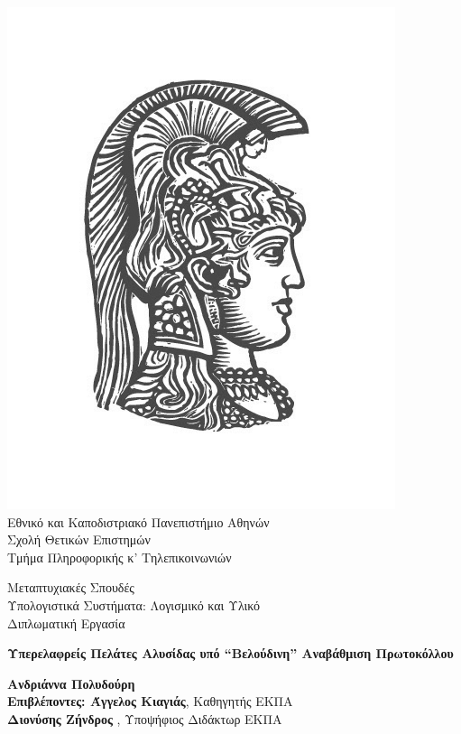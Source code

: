 \begin{center}
    
    \includegraphics[scale=0.8]{figures/logo_uoa.jpg}\\
    {\large Εθνικό και Καποδιστριακό Πανεπιστήμιο Αθηνών \\ 
    Σχολή Θετικών Επιστημών \\ 
    Τμήμα Πληροφορικής κ' Τηλεπικοινωνιών\\}
    \vspace{1cm}
    \begin{LARGE}
        Μεταπτυχιακές Σπουδές \\ 
        Υπολογιστικά Συστήματα: Λογισμικό και Υλικό\\
        \vspace{10mm}
        {Διπλωματική Εργασία}\\
        \vspace{0.8cm}
    \end{LARGE}
    {\textbf{\LARGE Υπερελαφρείς Πελάτες Αλυσίδας υπό ``Βελούδινη'' Αναβάθμιση Πρωτοκόλλου}}\\
    \vspace{2.5cm}


    \textbf{\large Ανδριάννα Πολυδούρη} \\ 
    \vspace{2.5cm} 
    \textbf{\large Επιβλέποντες: Άγγελος Κιαγιάς}\large , Καθηγητής ΕΚΠΑ\\
    \hspace{5.4cm}
    \textbf{\large Διονύσης Ζήνδρος} \large, Υποψήφιος Διδάκτωρ ΕΚΠΑ
    \vspace{2cm}

    \date{Αθήνα, \\ 1η Ιουνίου 2020}
    \pagebreak
\end{center}